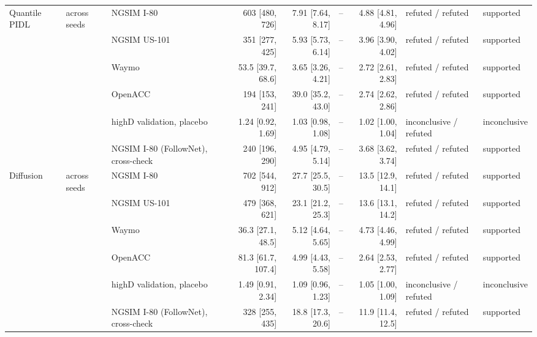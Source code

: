 \begin{longtable}{lllrrrrll}
\midrule
Quantile PIDL & across seeds & NGSIM I-80 & 603 [480, 726] & 7.91 [7.64, 8.17] & -- & 4.88 [4.81, 4.96] & refuted / refuted & supported \\
 &  & NGSIM US-101 & 351 [277, 425] & 5.93 [5.73, 6.14] & -- & 3.96 [3.90, 4.02] & refuted / refuted & supported \\
 &  & Waymo & 53.5 [39.7, 68.6] & 3.65 [3.26, 4.21] & -- & 2.72 [2.61, 2.83] & refuted / refuted & supported \\
 &  & OpenACC & 194 [153, 241] & 39.0 [35.2, 43.0] & -- & 2.74 [2.62, 2.86] & refuted / refuted & supported \\
 &  & highD validation, placebo & 1.24 [0.92, 1.69] & 1.03 [0.98, 1.08] & -- & 1.02 [1.00, 1.04] & inconclusive / refuted & inconclusive \\
 &  & NGSIM I-80 (FollowNet), cross-check & 240 [196, 290] & 4.95 [4.79, 5.14] & -- & 3.68 [3.62, 3.74] & refuted / refuted & supported \\
\midrule
Diffusion & across seeds & NGSIM I-80 & 702 [544, 912] & 27.7 [25.5, 30.5] & -- & 13.5 [12.9, 14.1] & refuted / refuted & supported \\
 &  & NGSIM US-101 & 479 [368, 621] & 23.1 [21.2, 25.3] & -- & 13.6 [13.1, 14.2] & refuted / refuted & supported \\
 &  & Waymo & 36.3 [27.1, 48.5] & 5.12 [4.64, 5.65] & -- & 4.73 [4.46, 4.99] & refuted / refuted & supported \\
 &  & OpenACC & 81.3 [61.7, 107.4] & 4.99 [4.43, 5.58] & -- & 2.64 [2.53, 2.77] & refuted / refuted & supported \\
 &  & highD validation, placebo & 1.49 [0.91, 2.34] & 1.09 [0.96, 1.23] & -- & 1.05 [1.00, 1.09] & inconclusive / refuted & inconclusive \\
 &  & NGSIM I-80 (FollowNet), cross-check & 328 [255, 435] & 18.8 [17.3, 20.6] & -- & 11.9 [11.4, 12.5] & refuted / refuted & supported \\
\end{longtable}
\endgroup
